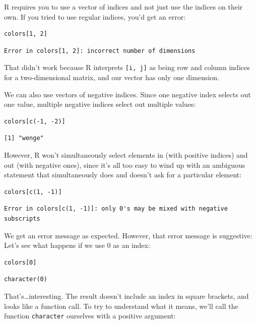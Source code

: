 R requires you to use a vector of indices
and not just use the indices on their own. If you tried to use regular indices, you'd get an error:

\begin{lstlisting}
colors[1, 2]
\end{lstlisting}

\begin{lstlisting}
Error in colors[1, 2]: incorrect number of dimensions
\end{lstlisting}

That didn't work because R interprets \texttt{[i,\ j]} as being
row and column indices for a two-dimensional matrix,
and our vector has only one dimension.

We can also use vectors of negative indices.
Since one negative index selects out one value,
multiple negative indices select out multiple values:

\begin{lstlisting}
colors[c(-1, -2)]
\end{lstlisting}

\begin{lstlisting}
[1] "wenge"
\end{lstlisting}

However,
R won't simultaneously select elements in (with positive indices) and out (with negative ones),
since it's all too easy to wind up with an ambiguous statement
that simultaneously does and doesn't ask for a particular element:

\begin{lstlisting}
colors[c(1, -1)]
\end{lstlisting}

\begin{lstlisting}
Error in colors[c(1, -1)]: only 0's may be mixed with negative subscripts
\end{lstlisting}

We get an error message as expected. However, that error message is suggestive:
Let's see what happens if we use 0 as an index:

\begin{lstlisting}
colors[0]
\end{lstlisting}

\begin{lstlisting}
character(0)
\end{lstlisting}

That's{\ldots}interesting.
The result doesn't include an index in square brackets,
and looks like a function call.
To try to understand what it means,
we'll call the function \texttt{character} ourselves
with a positive argument:

